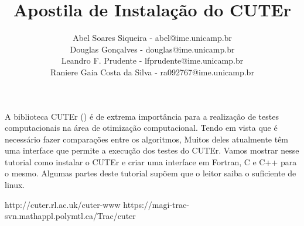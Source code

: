 \documentclass[letterpaper,11pt]{article}
\title{Apostila de Instalação do CUTEr}
\author{
Abel Soares Siqueira - {\small abel@ime.unicamp.br} \\ 
Douglas Gonçalves - {\small douglas@ime.unicamp.br} \\
Leandro F. Prudente - {\small lfprudente@ime.unicamp.br} \\
Raniere Gaia Costa da Silva - {\small ra092767@ime.unicamp.br}}
\numberwithin{equation}{section}
\begin{document}
\maketitle
\tableofcontents
\vspace{1 cm}

A biblioteca CUTEr (\cite{bib:cuter1,bib:cuter2}) é de extrema importância para a
realização de testes computacionais na área de otimização computacional. 
Tendo em vista que é necessário fazer comparações entre os algoritmos,
Muitos deles atualmente têm uma interface que permite a execução dos testes
do CUTEr. Vamos mostrar nesse tutorial como instalar o CUTEr e criar uma interface
em Fortran, C e C++ para o mesmo. Algumas partes deste tutorial supõem que o leitor
saiba o suficiente de linux.





\begin{thebibliography}{3}
 http://cuter.rl.ac.uk/cuter-www 
 https://magi-trac-svn.mathappl.polymtl.ca/Trac/cuter 
\end{thebibliography}
\end{document}
